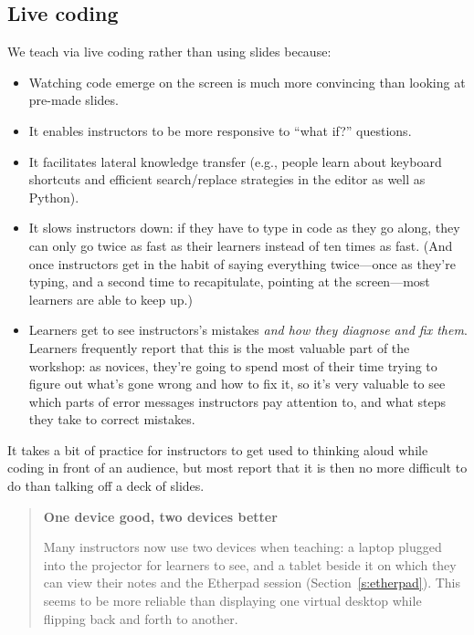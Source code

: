 \documentclass[10pt,a4paper,twocolumn]{article}
\begin{document}
\subsection{Live coding}

We teach via live coding rather than using slides because:

\begin{itemize}

\item Watching code emerge on the screen is much more convincing than
  looking at pre-made slides.

\item It enables instructors to be more responsive to ``what if?''
  questions.

\item It facilitates lateral knowledge transfer (e.g., people learn
  about keyboard shortcuts and efficient search/replace strategies in
  the editor as well as Python).

\item It slows instructors down: if they have to type in code as they
  go along, they can only go twice as fast as their learners instead
  of ten times as fast.  (And once instructors get in the habit of
  saying everything twice---once as they're typing, and a second time
  to recapitulate, pointing at the screen---most learners are able to
  keep up.)

\item Learners get to see instructors's mistakes \emph{and how they
  diagnose and fix them}.  Learners frequently report that this is the
  most valuable part of the workshop: as novices, they're going to
  spend most of their time trying to figure out what's gone wrong and
  how to fix it, so it's very valuable to see which parts of error
  messages instructors pay attention to, and what steps they take to
  correct mistakes.

\end{itemize}

It takes a bit of practice for instructors to
get used to thinking aloud while coding in front of an audience, but
most report that it is then no more difficult to do than talking off a
deck of slides.

\begin{quote}
\textbf{One device good, two devices better}

Many instructors now use two devices when teaching: a laptop plugged
into the projector for learners to see, and a tablet beside it on
which they can view their notes and the Etherpad session
(Section~\ref{s:etherpad}).  This seems to be more reliable than
displaying one virtual desktop while flipping back and forth to
another.
\end{quote}
\end{document}
